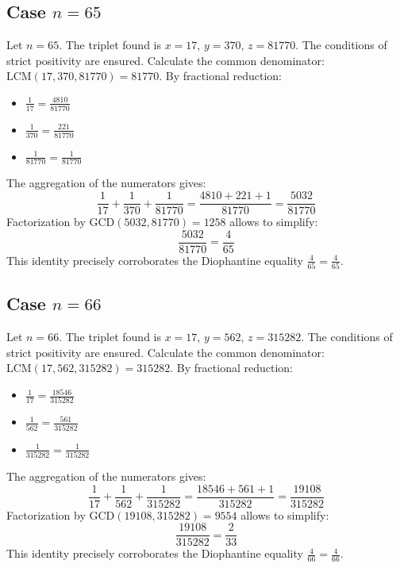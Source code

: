 \documentclass[11pt,a4paper]{article}
\begin{document}
\subsection{Case $n = 65$}
Let $n = 65$. The triplet found is $x = 17$, $y = 370$, $z = 81770$.
The conditions of strict positivity are ensured.
Calculate the common denominator: $\text{LCM}(17, 370, 81770) = 81770$.
By fractional reduction:
\begin{itemize}
    \item $\frac{1}{17} = \frac{4810}{81770}$
    \item $\frac{1}{370} = \frac{221}{81770}$
    \item $\frac{1}{81770} = \frac{1}{81770}$
\end{itemize}
The aggregation of the numerators gives:
$$ \frac{1}{17} + \frac{1}{370} + \frac{1}{81770} = \frac{4810 + 221 + 1}{81770} = \frac{5032}{81770} $$
Factorization by $\text{GCD}(5032, 81770) = 1258$ allows to simplify:
$$ \frac{5032}{81770} = \frac{4}{65} $$
This identity precisely corroborates the Diophantine equality $\frac{4}{65} = \frac{4}{65}$.

\subsection{Case $n = 66$}
Let $n = 66$. The triplet found is $x = 17$, $y = 562$, $z = 315282$.
The conditions of strict positivity are ensured.
Calculate the common denominator: $\text{LCM}(17, 562, 315282) = 315282$.
By fractional reduction:
\begin{itemize}
    \item $\frac{1}{17} = \frac{18546}{315282}$
    \item $\frac{1}{562} = \frac{561}{315282}$
    \item $\frac{1}{315282} = \frac{1}{315282}$
\end{itemize}
The aggregation of the numerators gives:
$$ \frac{1}{17} + \frac{1}{562} + \frac{1}{315282} = \frac{18546 + 561 + 1}{315282} = \frac{19108}{315282} $$
Factorization by $\text{GCD}(19108, 315282) = 9554$ allows to simplify:
$$ \frac{19108}{315282} = \frac{2}{33} $$
This identity precisely corroborates the Diophantine equality $\frac{4}{66} = \frac{4}{66}$.
\end{document}
